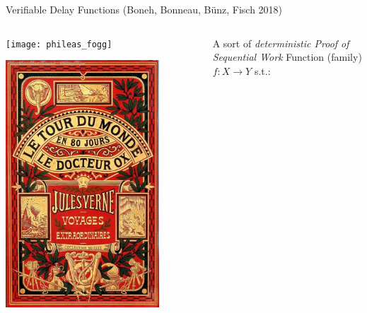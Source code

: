 \documentclass[aspectratio=169]{beamer}
\begin{document}
\begin{frame}{Verifiable Delay Functions (Boneh, Bonneau, Bünz, Fisch 2018)}
  \begin{columns}
    \begin{column}{0.2\textwidth}
      \centering
      \texttt{[image: phileas\_fogg]}

      \vfill

      \includegraphics[width=0.8\textwidth]{80jours-couverture}
    \end{column}
    \begin{column}{0.75\textwidth}
      \begin{block}{A sort of \textit{deterministic Proof of Sequential Work}}
        Function (family) \emph{$f:X\to Y$} s.t.:


\end{block}
\end{column}
\end{columns}
\end{frame}
\end{document}
